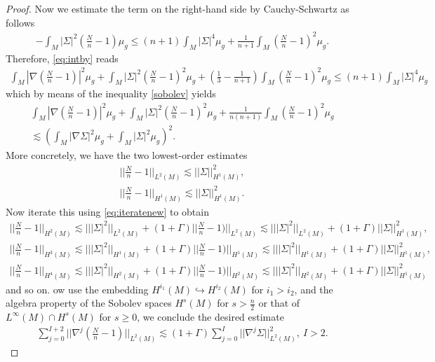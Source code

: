 \documentclass{amsart}
\begin{document}
\begin{proof}
Now we estimate the term on the right-hand side by Cauchy-Schwartz as follows 
\begin{align}
-\int_{M}|\Sigma|^{2}(\frac{N}{n}-1)\mu_{g}\leq (n+1)\int_{M}|\Sigma|^{4}\mu_{g}+\frac{1}{n+1}\int_{M}(\frac{N}{n}-1)^{2}\mu_{g}.    
\end{align}
Therefore, \ref{eq:intby} reads 
\begin{align}
 \int_{M}|\nabla(\frac{N}{n}-1)|^{2}\mu_{g}+\int_{M}|\Sigma|^{2}(\frac{N}{n}-1)^{2}\mu_{g}\nonumber+(\frac{1}{3}-\frac{1}{n+1})\int_{M}(\frac{N}{n}-1)^{2}\mu_{g}\leq (n+1)\int_{M}|\Sigma|^{4}\mu_{g}
\end{align}
which by means of the inequality \ref{sobolev} yields 
\begin{align}
  \int_{M}|\nabla(\frac{N}{n}-1)|^{2}\mu_{g}+\int_{M}|\Sigma|^{2}(\frac{N}{n}-1)^{2}\mu_{g}\nonumber+\frac{1}{n(n+1)}\int_{M}(\frac{N}{n}-1)^{2}\mu_{g} \\\nonumber 
  \lesssim \left(\int_{M}|\nabla\Sigma|^{2}\mu_{g}+\int_{M}|\Sigma|^{2}\mu_{g}\right)^{2}.
\end{align}
More concretely, we have the two lowest-order estimates 
\begin{align}
||\frac{N}{n}-1||_{L^{2}(M)}\lesssim ||\Sigma||^{2}_{H^{1}(M)},\\
||\frac{N}{n}-1||_{H^{1}(M)}\lesssim ||\Sigma||^{2}_{H^{1}(M)}.
\end{align}
Now iterate this using \ref{eq:iteratenew} to obtain 
\begin{align}
||\frac{N}{n}-1||_{H^{2}(M)}\lesssim |||\Sigma|^{2}||_{L^{2}(M)}+(1+\Gamma)||\frac{N}{n}-1)||_{L^{2}(M)}\lesssim |||\Sigma|^{2}||_{L^{2}(M)}\nonumber+(1+\Gamma)||\Sigma||^{2}_{H^{1}(M)},\\\nonumber
||\frac{N}{n}-1||_{H^{3}(M)}\lesssim |||\Sigma|^{2}||_{H^{1}(M)}+(1+\Gamma)||\frac{N}{n}-1)||_{H^{1}(M)}\lesssim |||\Sigma|^{2}||_{H^{1}(M)}+(1+\Gamma)||\Sigma||^{2}_{H^{1}(M)},\\\nonumber
||\frac{N}{n}-1||_{H^{4}(M)}\lesssim |||\Sigma|^{2}||_{H^{2}(M)}+(1+\Gamma)||\frac{N}{n}-1)||_{H^{2}(M)}\lesssim |||\Sigma|^{2}||_{H^{2}(M)}+(1+\Gamma)||\Sigma||^{2}_{H^{1}(M)}
\end{align}
and so on. ow use the embedding $H^{i_{1}}(M)\hookrightarrow H^{i_{2}}(M)$ for $i_{1}>i_{2}$, and the algebra property of the Sobolev spaces $H^{s}(M)$ for $s>\frac{n}{2}$ or that of $L^{\infty}(M)\cap H^{s}(M)$ for $s\geq 0$, we conclude the desired estimate 
\begin{align}
 \sum_{j=0}^{I+2}||\nabla^{j}(\frac{N}{n}-1)||_{L^{2}(M)}\lesssim (1+\Gamma)\sum_{j=0}^{I}||\nabla^{j}\Sigma||^{2}_{L^{2}(M)},~I>2.   
\end{align}



\end{proof}
\end{document}
